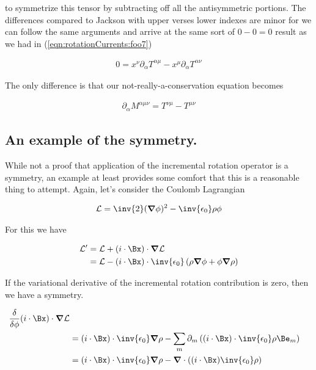 to symmetrize this tensor by subtracting off all the antisymmetric portions.  The differences compared to Jackson with upper verses lower indexes are minor for we can follow the same arguments and arrive at the same sort of $0 - 0 = 0$ result as we had in (\ref{eqn:rotationCurrents:foo7})

\begin{align}\label{eqn:rotationCurrents:foo13}
0 = x^\nu \partial_\alpha T^{\alpha\mu} - x^\mu \partial_\alpha T^{\alpha\nu}
\end{align}

The only difference is that our not-really-a-conservation equation becomes

\begin{align}\label{eqn:rotationCurrents:foo14}
\partial_\alpha M^{\alpha\mu\nu} =  T^{\nu\mu} - T^{\mu\nu}
\end{align}

\subsection{An example of the symmetry.}

While not a proof that application of the incremental rotation operator is a symmetry, an example at least provides some comfort that this is a reasonable thing to attempt.  Again, let's consider the Coulomb Lagrangian

\begin{align*}
\LL = \inv{2} (\spacegrad \phi)^2 - \inv{\epsilon_0}\rho \phi
\end{align*}

For this we have 

\begin{align*}
\LL' 
&= \LL + (i \cdot \Bx) \cdot \spacegrad \LL \\
&= \LL - (i \cdot \Bx) \cdot \inv{\epsilon_0} \left( \rho \spacegrad \phi + \phi \spacegrad \rho \right)
\end{align*}

If the variational derivative of the incremental rotation contribution is zero, then we have a symmetry.

\begin{align*}
\frac{\delta }{\delta \phi} (i \cdot \Bx) \cdot \spacegrad \LL \\
&=
(i \cdot \Bx) \cdot \inv{\epsilon_0} \spacegrad \rho 
- \sum_m \partial_m \left( (i \cdot \Bx) \cdot \inv{\epsilon_0} \rho \Be_m \right) \\
&=
(i \cdot \Bx) \cdot \inv{\epsilon_0} \spacegrad \rho 
- \spacegrad \cdot \left( (i \cdot \Bx) \inv{\epsilon_0} \rho \right) \\
\end{align*}

